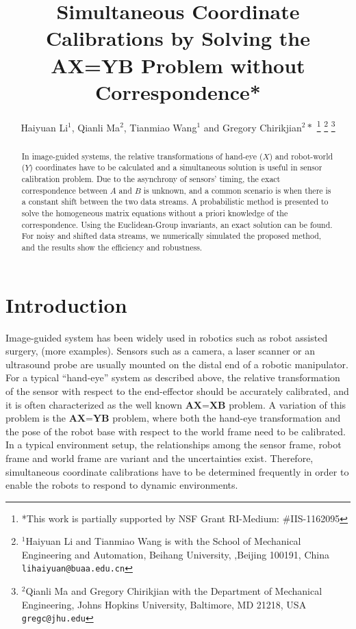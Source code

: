 \documentclass[letterpaper, 10 pt, conference]{ieeeconf}  %
\title{\LARGE \bf
Simultaneous Coordinate Calibrations by Solving the AX=YB Problem without Correspondence*
}
\author{Haiyuan Li$^{1}$, Qianli Ma$^{2}$, Tianmiao Wang$^{1}$ and Gregory Chirikjian$^{2}*$%
\thanks{*This work is partially
supported by NSF Grant RI-Medium: \#IIS-1162095}%
\thanks{$^{1}$Haiyuan Li and Tianmiao Wang is with the School of Mechanical Engineering and Automation, Beihang University,
        ,Beijing 100191, China
        {\tt\small lihaiyuan@buaa.edu.cn}}%
\thanks{$^{2}$Qianli Ma and Gregory Chirikjian with the Department of Mechanical Engineering, Johns Hopkins University,
        Baltimore, MD 21218, USA
        {\tt\small gregc@jhu.edu}}%
}
\begin{document}
\maketitle
\thispagestyle{empty}
\pagestyle{empty}


\begin{abstract}

In image-guided systems, the relative transformations of hand-eye ($X$) and robot-world ($Y$) coordinates have to be calculated and a simultaneous solution is useful in sensor calibration problem. Due to the asynchrony of sensors' timing, the exact correspondence between $A$ and $B$ is unknown, and a common scenario is when there is a constant shift between the two data streams. A probabilistic method is presented to solve the
homogeneous matrix equations without a priori knowledge of the correspondence. Using the Euclidean-Group invariants, an exact solution can be found. For noisy and shifted data streams, we numerically simulated the proposed method, and the results show the efficiency and robustness.

\end{abstract}



\section{Introduction}

Image-guided system has been widely used in robotics such as robot assisted surgery, (more examples). Sensors such as a camera, a laser scanner or an ultrasound probe are usually mounted on the distal end of a robotic manipulator. For a typical ``hand-eye'' system as described above, the relative transformation of the sensor with respect to the end-effector should be accurately calibrated, and it is often characterized as the well known $\textbf{AX=XB}$ problem. A variation of this problem is the $\textbf{AX=YB}$ problem, where both the hand-eye transformation and the pose of the robot base with respect to the world frame need to be calibrated. In a typical environment setup, the relationships among the sensor frame, robot frame and world frame are variant and the uncertainties exist. Therefore, simultaneous coordinate calibrations have to be determined frequently in order to enable the robots to respond to dynamic environments.
\end{document}
